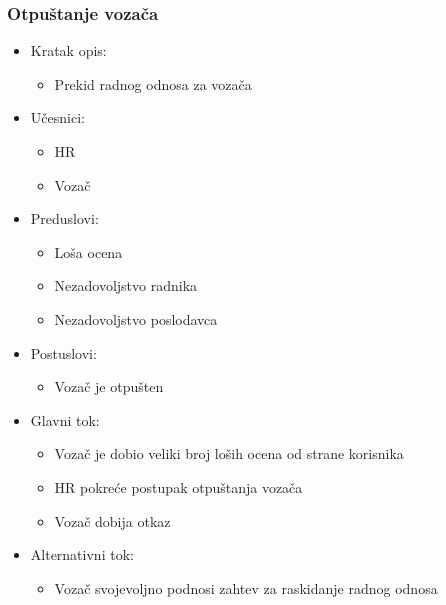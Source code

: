 \subsubsection{\bfseries Otpuštanje vozača}
\begin{itemize}
	\item Kratak opis:
		\begin{itemize}
			\item Prekid radnog odnosa za vozača
		\end{itemize}

	\item Učesnici:
		\begin{itemize}
		    \item HR
		    \item Vozač
		\end{itemize}


	\item Preduslovi:
		\begin{itemize}
		    \item Loša ocena
		    \item Nezadovoljstvo radnika
		    \item Nezadovoljstvo poslodavca
		\end{itemize}


	\item Postuslovi:
		\begin{itemize}
			\item Vozač je otpušten
	\end{itemize}

	\item Glavni tok:
		\begin{itemize}
		    \item Vozač je dobio veliki broj loših ocena od strane korisnika
		    \item HR pokreće postupak otpuštanja vozača
		    \item Vozač dobija otkaz
		\end{itemize}

	\item Alternativni tok:
		\begin{itemize}
		    \item Vozač svojevoljno podnosi zahtev za raskidanje radnog odnosa
		\end{itemize}

\end{itemize}


